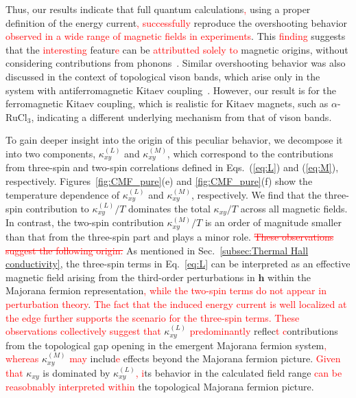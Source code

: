 \documentclass[twocolumn,superscriptaddress,showpacs, longbibliography, aps, prx]{revtex4-2}
\newcommand{\red}[1]{\textcolor{red}{#1}}
\newcommand{\redsout}[1]{\textcolor{red}{\sout{#1}}}
\begin{document}
Thus, our results indicate that full quantum calculations\red{,} using a proper definition of the energy current\red{, successfully} reproduce the overshooting behavior \red{observed in a wide range of magnetic fields in %
experiments}. 
This \red{finding} suggests that the %
\red{interesting} featur\red{e} %
can be %
\red{attributted solely to} magnetic origins, without considering contributions from phonons~\cite{Ye2018Quantization,Vinkler2018}. 
Similar overshooting behavior was also discussed in the context of topological vison bands, which arise only in the system with antiferromagnetic Kitaev coupling~\cite{Joy2022}. 
However, our result is for the ferromagnetic Kitaev coupling, which is realistic for Kitaev magnets, such as $\alpha$-RuCl$_3$, indicating a different underlying mechanism from that of vison bands. 

To gain deeper insight into the origin of this peculiar behavior, we decompose it into two components, $\kappa_{xy}^{(L)}$ and  $\kappa_{xy}^{(M)}$, which correspond to the contributions from three-spin and two-spin correlations defined in Eqs.~(\ref{eq:L}) and (\ref{eq:M}), respectively.
Figures~\ref{fig:CMF_pure}(e) and \ref{fig:CMF_pure}(f) show the temperature dependence of $\kappa_{xy}^{(L)}$ and  $\kappa_{xy}^{(M)}$, respectively.
We find that the three-spin contribution to $\kappa_{xy}^{(L)}/T$ dominates the total $\kappa_{xy}/T$ across all magnetic fields.
In contrast, the two-spin contribution $\kappa_{xy}^{(M)}/T$ is an order of magnitude smaller than that from the three-spin part and plays a minor role.
\redsout{These observations suggest the following origin.} 
As mentioned in Sec.~\ref{subsec:Thermal Hall conductivity}, the three-spin terms in Eq.~\eqref{eq:L} can be interpreted as an effective magnetic field arising from the third-order perturbations in $\bm{h}$ within the Majorana fermion representation\red{, while the two-spin terms do not appear in perturbation theory}. 
\red{The fact that the induced energy current is well localized at the edge further supports the scenario for the three-spin terms.} 
\red{These observations collectively suggest that} $\kappa_{xy}^{(L)}$ %
\red{predominantly} reflec\red{t %
c}ontributions from the topological gap opening in the emergent Majorana fermion system\red{, whereas} %
$\kappa_{xy}^{(M)}$ \red{may} includ\red{e} %
effects beyond the Majorana fermion picture.
\red{Given that} $\kappa_{xy}$ is dominated by $\kappa_{xy}^{(L)}$\red{, %
i}ts behavior in the calculated field range %
\red{can be reasobnably interpreted within} the topological Majorana fermion picture.
\end{document}
